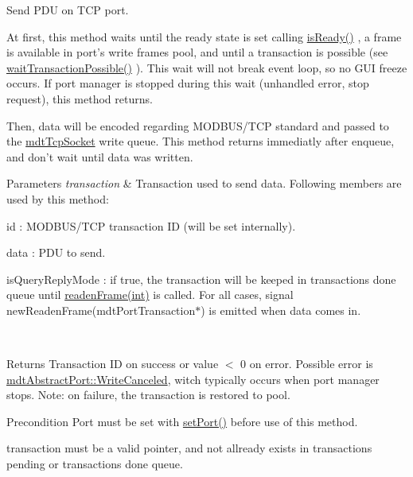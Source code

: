 Send PDU on TCP port. 

At first, this method waits until the ready state is set calling \hyperlink{classmdt_modbus_tcp_port_manager_a5477eb7e8d57c5a42004046b426e39b6}{isReady()} , a frame is available in port's write frames pool, and until a transaction is possible (see \hyperlink{classmdt_port_manager_ac04a12f8aa20ba04695083afce45a6cc}{waitTransactionPossible()} ). This wait will not break event loop, so no GUI freeze occurs. If port manager is stopped during this wait (unhandled error, stop request), this method returns.

Then, data will be encoded regarding MODBUS/TCP standard and passed to the \hyperlink{classmdt_tcp_socket}{mdtTcpSocket} write queue. This method returns immediatly after enqueue, and don't wait until data was written.


\begin{DoxyParams}{Parameters}
{\em transaction} & Transaction used to send data. Following members are used by this method:
\begin{DoxyItemize}
\item id : MODBUS/TCP transaction ID (will be set internally).
\item data : PDU to send.
\item isQueryReplyMode : if true, the transaction will be keeped in transactions done queue until \hyperlink{classmdt_port_manager_a830ae182d06dd6a52c43a7f45b9240ac}{readenFrame(int)} is called. For all cases, signal newReadenFrame(mdtPortTransaction$\ast$) is emitted when data comes in.
\end{DoxyItemize}\\
\hline
\end{DoxyParams}
\begin{DoxyReturn}{Returns}
Transaction ID on success or value $<$ 0 on error. Possible error is \hyperlink{classmdt_abstract_port_ad4121bb930c95887e77f8bafa065a85eae50ff4a9393507ad39005ddc7d5be42f}{mdtAbstractPort::WriteCanceled}, witch typically occurs when port manager stops. Note: on failure, the transaction is restored to pool. 
\end{DoxyReturn}
\begin{DoxyPrecond}{Precondition}
Port must be set with \hyperlink{classmdt_port_manager_afcd156b2d0c9d340999935efb6cd8cb6}{setPort()} before use of this method. 

transaction must be a valid pointer, and not allready exists in transactions pending or transactions done queue. 
\end{DoxyPrecond}


